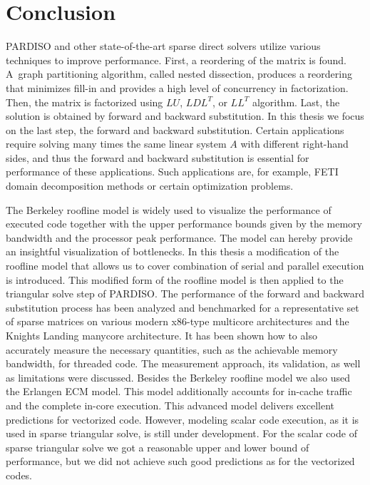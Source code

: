 \chapter{Conclusion}
\label{sec:conclusion}

PARDISO and other state-of-the-art sparse direct solvers utilize various techniques to improve performance. First, a reordering of the matrix is found. A~graph partitioning algorithm, called nested dissection, produces a reordering that minimizes fill-in and provides a high level of concurrency in factorization. Then, the matrix is factorized using $LU$, $LDL^T$, or $LL^T$ algorithm. Last, the solution is obtained by forward and backward substitution. In this thesis we focus on the last step, the forward and backward substitution. Certain applications require solving many times the same linear system $A$ with different right-hand sides, and thus the forward and backward substitution is essential for performance of these applications. Such applications are, for example, FETI domain decomposition methods or certain optimization problems.

The Berkeley roofline model is widely used to visualize the performance of executed code together with the upper performance bounds given by the memory bandwidth and the processor peak performance. The model can hereby provide an insightful visualization of bottlenecks. In this thesis a modification of the roofline model that allows us to cover combination of serial and parallel execution is introduced. This modified form of the roofline model is then applied to the triangular solve step of PARDISO. The performance of the forward and backward substitution process has been analyzed and benchmarked for a representative set of sparse matrices on various modern x86-type multicore architectures and the Knights Landing manycore architecture. It has been shown how to also accurately measure the necessary quantities, such as the achievable memory bandwidth, for threaded code. The measurement approach, its validation, as well as limitations were discussed.
Besides the Berkeley roofline model we also used the Erlangen ECM model. This model additionally accounts for in-cache traffic and the complete in-core execution. This advanced model delivers excellent predictions for vectorized code. However, modeling scalar code execution, as it is used in sparse triangular solve, is still under development. For the scalar code of sparse triangular solve we got a reasonable upper and lower bound of performance, but we did not achieve such good predictions as for the vectorized codes.

